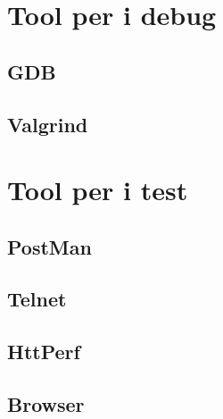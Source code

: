 \documentclass[italian]{tktltiki2}
\begin{document}
\section{Tool per i debug}
\subsection{GDB}
\subsection{Valgrind}

\section{Tool per i test}
\subsection{PostMan}
\subsection{Telnet}
\subsection{HttPerf}
\subsection{Browser}
\end{document}
